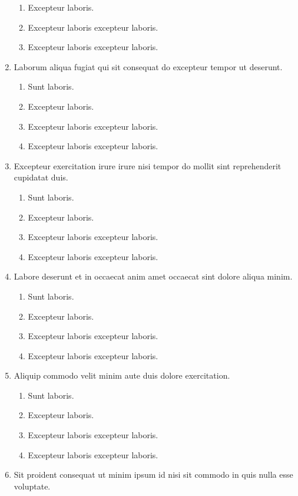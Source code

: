 \documentclass[a4paper,12pt]{article}
\begin{document}
\begin{enumerate}[label=\textbf{\arabic*.}]
\begin{enumerate}
    \item Excepteur laboris.
    \item Excepteur laboris excepteur laboris.
    \item Excepteur laboris excepteur laboris.
  \end{enumerate}
  \item Laborum aliqua fugiat qui sit consequat do excepteur tempor ut deserunt.
  \begin{enumerate}
    \item Sunt laboris.
    \item Excepteur laboris.
    \item Excepteur laboris excepteur laboris.
    \item Excepteur laboris excepteur laboris.
  \end{enumerate}
  \item Excepteur exercitation irure irure nisi tempor do mollit sint reprehenderit cupidatat duis.
  \begin{enumerate}
    \item Sunt laboris.
    \item Excepteur laboris.
    \item Excepteur laboris excepteur laboris.
    \item Excepteur laboris excepteur laboris.
  \end{enumerate}
  \item Labore deserunt et in occaecat anim amet occaecat sint dolore aliqua minim.
  \begin{enumerate}
    \item Sunt laboris.
    \item Excepteur laboris.
    \item Excepteur laboris excepteur laboris.
    \item Excepteur laboris excepteur laboris.
  \end{enumerate}
  \item Aliquip commodo velit minim aute duis dolore exercitation.
  \begin{enumerate}
    \item Sunt laboris.
    \item Excepteur laboris.
    \item Excepteur laboris excepteur laboris.
    \item Excepteur laboris excepteur laboris.
  \end{enumerate}
  \item Sit proident consequat ut minim ipsum id nisi sit commodo in quis nulla esse voluptate.

\end{enumerate}
\end{document}
